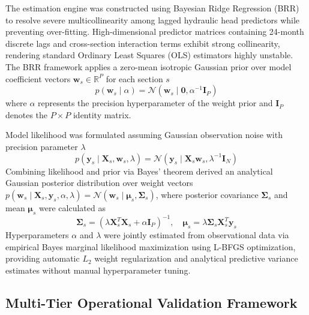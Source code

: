 The estimation engine was constructed using Bayesian Ridge Regression (BRR) to resolve severe multicollinearity among lagged hydraulic head predictors while preventing over-fitting. High-dimensional predictor matrices containing 24-month discrete lags and cross-section interaction terms exhibit strong collinearity, rendering standard Ordinary Least Squares (OLS) estimators highly unstable. The BRR framework applies a zero-mean isotropic Gaussian prior over model coefficient vectors $\boldsymbol{w}_s \in \mathbb{R}^P$ for each section $s$
\begin{equation}
p(\boldsymbol{w}_s \mid \alpha) = \mathcal{N}\left( \boldsymbol{w}_s \mid \mathbf{0}, \alpha^{-1}\mathbf{I}_P \right)
\label{eq:weight_prior}
\end{equation}
where $\alpha$ represents the precision hyperparameter of the weight prior and $\mathbf{I}_P$ denotes the $P \times P$ identity matrix.

Model likelihood was formulated assuming Gaussian observation noise with precision parameter $\lambda$
\begin{equation}
p(\mathbf{y}_s \mid \mathbf{X}_s, \boldsymbol{w}_s, \lambda) = \mathcal{N}\left( \mathbf{y}_s \mid \mathbf{X}_s \boldsymbol{w}_s, \lambda^{-1}\mathbf{I}_N \right)
\label{eq:likelihood}
\end{equation}
Combining likelihood and prior via Bayes' theorem derived an analytical Gaussian posterior distribution over weight vectors $p(\boldsymbol{w}_s \mid \mathbf{X}_s, \mathbf{y}_s, \alpha, \lambda) = \mathcal{N}\left( \boldsymbol{w}_s \mid \boldsymbol{\mu}_s, \boldsymbol{\Sigma}_s \right)$, where posterior covariance $\boldsymbol{\Sigma}_s$ and mean $\boldsymbol{\mu}_s$ were calculated as
\begin{equation}
\boldsymbol{\Sigma}_s = \left( \lambda \mathbf{X}_s^T \mathbf{X}_s + \alpha \mathbf{I}_P \right)^{-1}, \quad \boldsymbol{\mu}_s = \lambda \boldsymbol{\Sigma}_s \mathbf{X}_s^T \mathbf{y}_s
\label{eq:posterior_distribution}
\end{equation}
Hyperparameters $\alpha$ and $\lambda$ were jointly estimated from observational data via empirical Bayes marginal likelihood maximization using L-BFGS optimization, providing automatic $L_2$ weight regularization and analytical predictive variance estimates without manual hyperparameter tuning.

\subsection{Multi-Tier Operational Validation Framework}
\label{subsec:operational_validation_framework}

